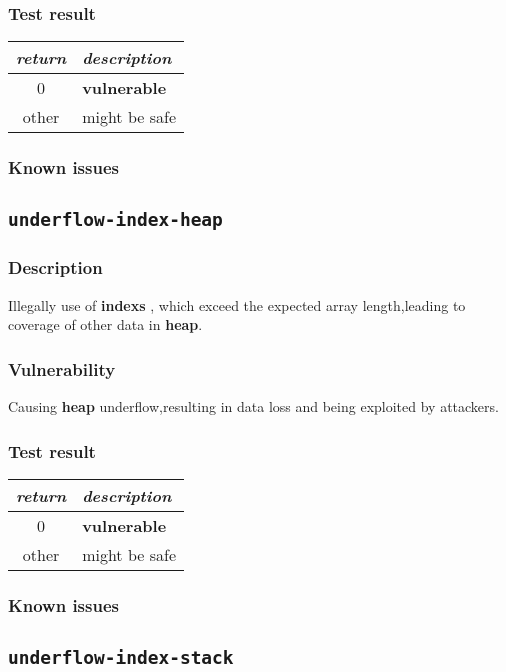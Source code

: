 \documentclass[a4paper]{book}
\begin{document}
\subsubsection{Test result}
\begin{tabular}{cl}
  \toprule
  \emph{return}  & \emph{description} \\
  \midrule
  0              & \textbf{vulnerable} \\
  other          & might be safe \\
  \bottomrule
\end{tabular}
\subsubsection{Known issues}


\newpage

\subsection{\texttt{underflow-index-heap}}\label{test-underflow-index-heap}
\subsubsection{Description}
Illegally use of \textbf{indexs} , which exceed the expected array length,leading to coverage of other data in \textbf{heap}.\subsubsection{Vulnerability}
Causing \textbf{heap} underflow,resulting in data loss and being exploited by attackers.
\subsubsection{Test result}
\begin{tabular}{cl}
  \toprule
  \emph{return}  & \emph{description} \\
  \midrule
  0              & \textbf{vulnerable} \\
  other          & might be safe \\
  \bottomrule
\end{tabular}
\subsubsection{Known issues}
\newpage

\subsection{\texttt{underflow-index-stack}}\label{test-underflow-index-stack}
\end{document}
